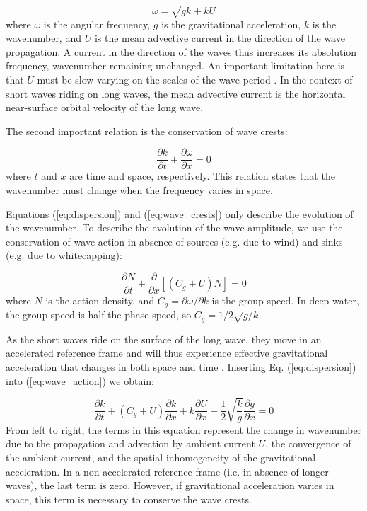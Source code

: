 \documentclass[draft]{agujournal2019}
\begin{document}
\begin{equation}
\label{eq:dispersion}
\omega = \sqrt{gk} + k U
\end{equation}
where $\omega$ is the angular frequency, $g$ is the gravitational acceleration,
$k$ is the wavenumber, and $U$ is the mean advective current in the direction
of the wave propagation.
A current in the direction of the waves thus increases its absolution frequency,
wavenumber remaining unchanged.
An important limitation here is that $U$ must be slow-varying on the scales of
the wave period \cite{bretherton1968wavetrains}.
In the context of short waves riding on long waves, the mean advective current
is the horizontal near-surface orbital velocity of the long wave.

The second important relation is the conservation of wave crests:

\begin{equation}
\label{eq:wave_crests}
\dfrac{\partial k}{\partial t}
+ \dfrac{\partial \omega}{\partial x}
= 0
\end{equation}
where $t$ and $x$ are time and space, respectively.
This relation states that the wavenumber must change when the frequency varies
in space.

Equations (\ref{eq:dispersion}) and (\ref{eq:wave_crests}) only describe the
evolution of the wavenumber.
To describe the evolution of the wave amplitude, we use the conservation of wave
action in absence of sources (e.g. due to wind) and sinks (e.g. due to whitecapping):

\begin{equation}
\label{eq:wave_action}
\dfrac{\partial N}{\partial t}
+ \dfrac{\partial}{\partial x} \left[\left(C_g + U\right)N\right]
= 0
\end{equation}
where $N$ is the action density, and $C_g = \partial \omega / \partial k$ is the
group speed.
In deep water, the group speed is half the phase speed, so $C_g = 1/2\sqrt{g/k}$.

As the short waves ride on the surface of the long wave,
they move in an accelerated reference frame and will thus experience effective
gravitational acceleration that changes in both space and time \cite{longuet1986eulerian,longuet1987propagation}.
Inserting Eq. (\ref{eq:dispersion}) into (\ref{eq:wave_action}) we obtain:

\begin{equation}
\label{eq:wavenumber}
\dfrac{\partial k}{\partial t}
+ \left(C_g + U\right) \dfrac{\partial k}{\partial x}
+ k \dfrac{\partial U}{\partial x}
+ \dfrac{1}{2} \sqrt{\dfrac{k}{g}} \dfrac{\partial g}{\partial x}
= 0
\end{equation}
From left to right, the terms in this equation represent the change in wavenumber
due to the propagation and advection by ambient current $U$, the convergence of
the ambient current, and the spatial inhomogeneity of the gravitational acceleration.
In a non-accelerated reference frame (i.e. in absence of longer waves), the last
term is zero.
However, if gravitational acceleration varies in space, this term is necessary
to conserve the wave crests.
\end{document}
